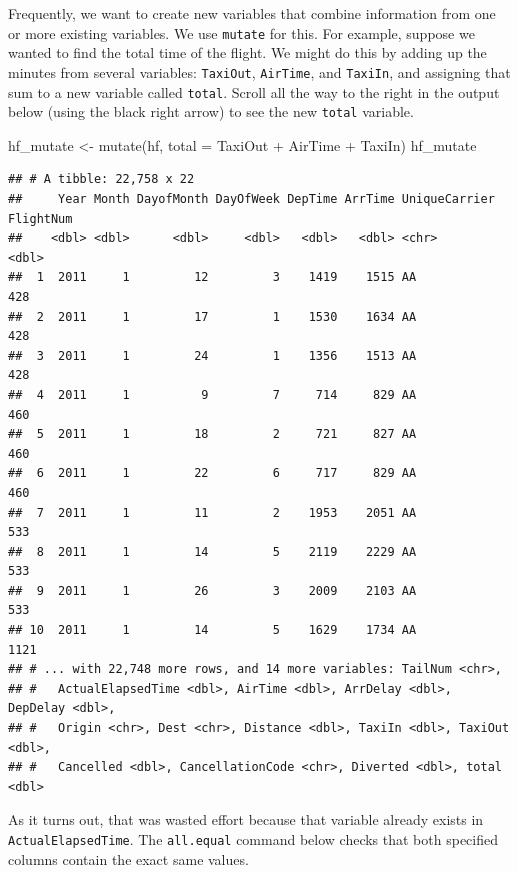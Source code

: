 \documentclass[
]{book}
\newenvironment{Shaded}{\begin{snugshade}}{\end{snugshade}}
\newcommand{\AttributeTok}[1]{\textcolor[rgb]{0.77,0.63,0.00}{#1}}
\newcommand{\FunctionTok}[1]{\textcolor[rgb]{0.00,0.00,0.00}{#1}}
\newcommand{\NormalTok}[1]{#1}
\newcommand{\OtherTok}[1]{\textcolor[rgb]{0.56,0.35,0.01}{#1}}
\newcommand{\SpecialCharTok}[1]{\textcolor[rgb]{0.00,0.00,0.00}{#1}}
\begin{document}
Frequently, we want to create new variables that combine information from one or more existing variables. We use \texttt{mutate} for this. For example, suppose we wanted to find the total time of the flight. We might do this by adding up the minutes from several variables: \texttt{TaxiOut}, \texttt{AirTime}, and \texttt{TaxiIn}, and assigning that sum to a new variable called \texttt{total}. Scroll all the way to the right in the output below (using the black right arrow) to see the new \texttt{total} variable.

\begin{Shaded}
\begin{Highlighting}[]
\NormalTok{hf\_mutate }\OtherTok{\textless{}{-}} \FunctionTok{mutate}\NormalTok{(hf, }\AttributeTok{total =}\NormalTok{ TaxiOut }\SpecialCharTok{+}\NormalTok{ AirTime }\SpecialCharTok{+}\NormalTok{ TaxiIn)}
\NormalTok{hf\_mutate}
\end{Highlighting}
\end{Shaded}

\begin{verbatim}
## # A tibble: 22,758 x 22
##     Year Month DayofMonth DayOfWeek DepTime ArrTime UniqueCarrier FlightNum
##    <dbl> <dbl>      <dbl>     <dbl>   <dbl>   <dbl> <chr>             <dbl>
##  1  2011     1         12         3    1419    1515 AA                  428
##  2  2011     1         17         1    1530    1634 AA                  428
##  3  2011     1         24         1    1356    1513 AA                  428
##  4  2011     1          9         7     714     829 AA                  460
##  5  2011     1         18         2     721     827 AA                  460
##  6  2011     1         22         6     717     829 AA                  460
##  7  2011     1         11         2    1953    2051 AA                  533
##  8  2011     1         14         5    2119    2229 AA                  533
##  9  2011     1         26         3    2009    2103 AA                  533
## 10  2011     1         14         5    1629    1734 AA                 1121
## # ... with 22,748 more rows, and 14 more variables: TailNum <chr>,
## #   ActualElapsedTime <dbl>, AirTime <dbl>, ArrDelay <dbl>, DepDelay <dbl>,
## #   Origin <chr>, Dest <chr>, Distance <dbl>, TaxiIn <dbl>, TaxiOut <dbl>,
## #   Cancelled <dbl>, CancellationCode <chr>, Diverted <dbl>, total <dbl>
\end{verbatim}

As it turns out, that was wasted effort because that variable already exists in \texttt{ActualElapsedTime}. The \texttt{all.equal} command below checks that both specified columns contain the exact same values.
\end{document}
